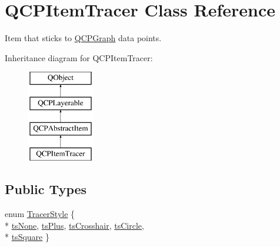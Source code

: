 \hypertarget{classQCPItemTracer}{\section{Q\-C\-P\-Item\-Tracer Class Reference}
\label{classQCPItemTracer}
}


Item that sticks to \hyperlink{classQCPGraph}{Q\-C\-P\-Graph} data points.  


Inheritance diagram for Q\-C\-P\-Item\-Tracer\-:\begin{figure}[H]
\begin{center}
\leavevmode
\includegraphics[height=4.000000cm]{classQCPItemTracer}
\end{center}
\end{figure}
\subsection*{Public Types}
\begin{DoxyCompactItemize}
\item 
enum \hyperlink{classQCPItemTracer_a2f05ddb13978036f902ca3ab47076500}{Tracer\-Style} \{ \\*
\hyperlink{classQCPItemTracer_a2f05ddb13978036f902ca3ab47076500aac27462c79146225bfa8fba24d2ee8a4}{ts\-None}, 
\hyperlink{classQCPItemTracer_a2f05ddb13978036f902ca3ab47076500a3323fb04017146e4885e080a459472fa}{ts\-Plus}, 
\hyperlink{classQCPItemTracer_a2f05ddb13978036f902ca3ab47076500af562ec81ac3ba99e26ef8540cf1ec16f}{ts\-Crosshair}, 
\hyperlink{classQCPItemTracer_a2f05ddb13978036f902ca3ab47076500ae2252c28f4842880d71e9f94e69de94e}{ts\-Circle}, 
\\*
\hyperlink{classQCPItemTracer_a2f05ddb13978036f902ca3ab47076500a4ed5f01f2c5fd86d980366d79f481b9b}{ts\-Square}
 \}
\end{DoxyCompactItemize}
